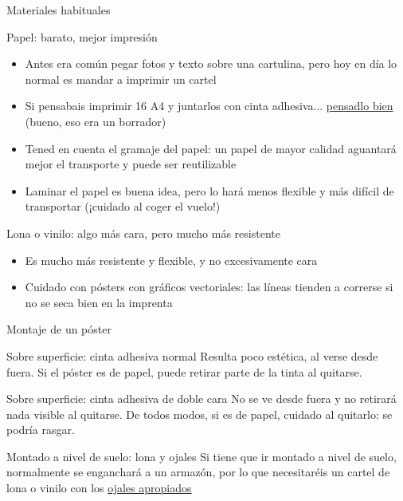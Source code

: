 \documentclass[xcolor=svgnames,compress]{beamer}
\begin{document}
\begin{frame}{Materiales habituales}
  \hypersetup{colorlinks,linkcolor=blue}

  \begin{block}{Papel: barato, mejor impresión}
    \begin{itemize}
    \item Antes era común pegar fotos y texto sobre una cartulina,
      pero hoy en día lo normal es mandar a imprimir un cartel
    \item Si pensabais imprimir 16 A4 y juntarlos con cinta
      adhesiva... \href{http://www.flickr.com/photos/damienclauzel/4465767871/}{pensadlo
        bien} (bueno, eso era un borrador)
    \item Tened en cuenta el gramaje del papel: un papel de mayor
      calidad aguantará mejor el transporte y puede ser reutilizable
    \item Laminar el papel es buena idea, pero lo hará menos flexible
      y más difícil de transportar (¡cuidado al coger el vuelo!)
    \end{itemize}
  \end{block}

  \begin{block}{Lona o vinilo: algo más cara, pero mucho más resistente}
    \begin{itemize}
    \item Es mucho más resistente y flexible, y no excesivamente cara
    \item Cuidado con pósters con gráficos vectoriales: las líneas
      tienden a correrse si no se seca bien en la imprenta
    \end{itemize}
  \end{block}

\end{frame}

\begin{frame}{Montaje de un póster}

  \begin{block}{Sobre superficie: cinta adhesiva normal}
    Resulta poco estética, al verse desde fuera. Si el póster es de
    papel, puede retirar parte de la tinta al quitarse.
  \end{block}

  \begin{block}{Sobre superficie: cinta adhesiva de doble cara}
    No se ve desde fuera y no retirará nada visible al quitarse. De
    todos modos, si es de papel, cuidado al quitarlo: se podría
    rasgar.
  \end{block}

  \begin{block}{Montado a nivel de suelo: lona y ojales}
    Si tiene que ir montado a nivel de suelo, normalmente se
    enganchará a un armazón, por lo que necesitaréis un cartel de lona
    o vinilo con los
    \href{http://www.printcolorweb.com/spa/item/index.html?msgOrigen=9\&msgValor=58\&CODART=lona}{ojales
      apropiados}
  \end{block}

\end{frame}
\end{document}
